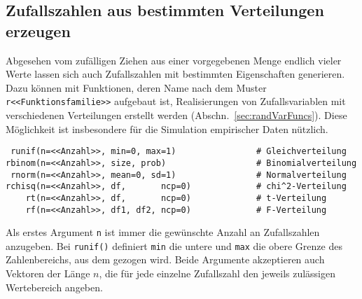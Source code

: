 \subsection{Zufallszahlen aus bestimmten Verteilungen erzeugen}
\label{sec:randNum}

Abgesehen vom zufälligen Ziehen aus einer vorgegebenen Menge endlich vieler Werte lassen sich auch Zufallszahlen mit bestimmten Eigenschaften generieren. Dazu können mit Funktionen, deren Name nach dem Muster \lstinline!r<<Funktionsfamilie>>! aufgebaut ist, Realisierungen von Zufallsvariablen mit verschiedenen Verteilungen erstellt werden (Abschn.\ \ref{sec:randVarFuncs}). Diese Möglichkeit ist insbesondere für die Simulation empirischer Daten nützlich.
\begin{lstlisting}
 runif(n=<<Anzahl>>, min=0, max=1)                # Gleichverteilung
rbinom(n=<<Anzahl>>, size, prob)                  # Binomialverteilung
 rnorm(n=<<Anzahl>>, mean=0, sd=1)                # Normalverteilung
rchisq(n=<<Anzahl>>, df,       ncp=0)             # chi^2-Verteilung
    rt(n=<<Anzahl>>, df,       ncp=0)             # t-Verteilung
    rf(n=<<Anzahl>>, df1, df2, ncp=0)             # F-Verteilung
\end{lstlisting}

Als erstes Argument \lstinline!n! ist immer die gewünschte Anzahl an Zufallszahlen anzugeben. Bei \lstinline!runif()! definiert \lstinline!min! die untere und \lstinline!max! die obere Grenze des Zahlenbereichs, aus dem gezogen wird. Beide Argumente akzeptieren auch Vektoren der Länge $n$, die für jede einzelne Zufallszahl den jeweils zulässigen Wertebereich angeben.

